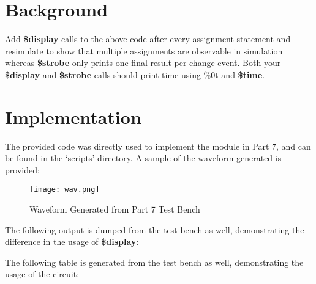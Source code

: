 \documentclass[paper=usletter, fontsize=12pt]{article}
\begin{document}
    \vspace{-0.1in}

    \section{Background}
    Add \textbf{\$display} calls to the above code after every assignment statement and resimulate to show that multiple assignments are observable in simulation whereas \textbf{\$strobe} only prints one final result per change event. Both your \textbf{\$display} and \textbf{\$strobe} calls should print time using \%0t and \textbf{\$time}.

    \section{Implementation}
    The provided code was directly used to implement the module in Part 7, and can be found in the `scripts' directory. A sample of the waveform generated is provided:

    \begin{figure}[ht]
        \begin{center}
            \texttt{[image: wav.png]}
            \caption{Waveform Generated from Part 7 Test Bench} \label{fig:wav}
        \end{center}
    \end{figure}

    The following output is dumped from the test bench as well, demonstrating the difference in the usage of \textbf{\$display}:

    The following table is generated from the test bench as well, demonstrating the usage of the circuit:
\end{document}
